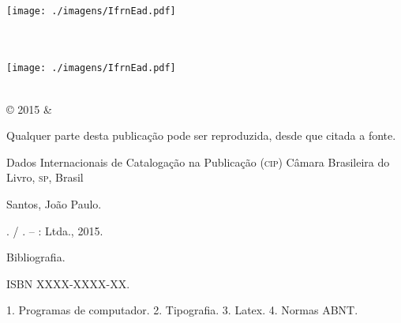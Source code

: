 \documentclass[
	10pt,				%
	openright,			%
	twoside,			%
	a5paper,			%
	english,			%
	french,				%
	spanish,			%
	brazil,				%
	sumario=tradicional
]{abntex2}
\begin{document}
\frenchspacing

\frontmatter

\begin{titlingpage}
\phantom{xxx}
\vspace{0.5cm}
\huge
\raggedright
\imprimirautor\\
\vspace{2.5cm}
\huge 
{\raggedleft
\texttt{[image: ./imagens/IfrnEad.pdf]}\\[1cm]
\textit{\textcolor{blue}{\imprimirtitulo}}\\[1cm]
}
\centering 
\vfill
\Large
\imprimirinstituicao
\end{titlingpage}

\begin{titlingpage}

\phantom{xxx}
\vspace{0.5cm}
\huge
\raggedright
\imprimirautor\\
\vspace{2.5cm}
\huge 
{\raggedleft
\texttt{[image: ./imagens/IfrnEad.pdf]}\\[1cm]
\textit{\textcolor{blue}{\imprimirtitulo}}\\[1cm]
}
\centering 
\vfill
\Large
\imprimirinstituicao

\clearpage
\ABNTEXfontereduzida
© 2015 \imprimirautor \space \& \imprimirinstituicao

Qualquer parte desta publicação pode ser reproduzida, desde que citada a fonte.

\vspace*{\fill}

\begin{center}
Dados Internacionais de Catalogação na Publicação (\textsc{cip})
Câmara Brasileira do Livro, \textsc{sp}, Brasil
\end{center}

\begin{mdframed}
\noindent Santos, João Paulo.

\imprimirtitulo. / \imprimirautor. -- \imprimirlocal: \imprimirinstituicao
Ltda., 2015.

\medskip

Bibliografia.

ISBN XXXX-XXXX-XX.

\medskip

1. Programas de computador. 2. Tipografia. 3. Latex. 4. Normas ABNT.

\end{mdframed}

\end{titlingpage}
\end{document}
